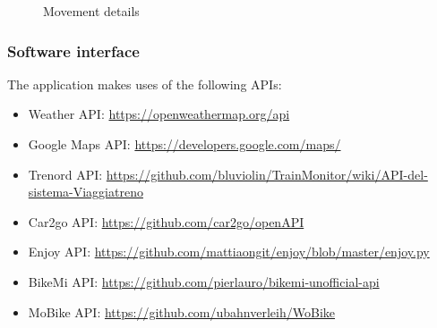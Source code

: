 \clearpage
\begin{figure}[!h]
	\centering
	\begin{minipage}[b]{0.65\textwidth}
		\caption{Movement details}
	\end{minipage}
\end{figure}

\subsubsection{Software interface}
The application makes uses of the following APIs:
\begin{itemize}
	\item Weather API: \href{url}{https://openweathermap.org/api}
	\item Google Maps API: \href{url}{https://developers.google.com/maps/}
	\item Trenord API: \href{url}{https://github.com/bluviolin/TrainMonitor/wiki/API-del-sistema-Viaggiatreno}
	\item Car2go API: \href{url}{https://github.com/car2go/openAPI}
	\item Enjoy API: \href{url}{https://github.com/mattiaongit/enjoy/blob/master/enjoy.py}
	\item BikeMi API: \href{url}{https://github.com/pierlauro/bikemi-unofficial-api}
	\item MoBike API: \href{url}{https://github.com/ubahnverleih/WoBike}
\end{itemize}
\clearpage
